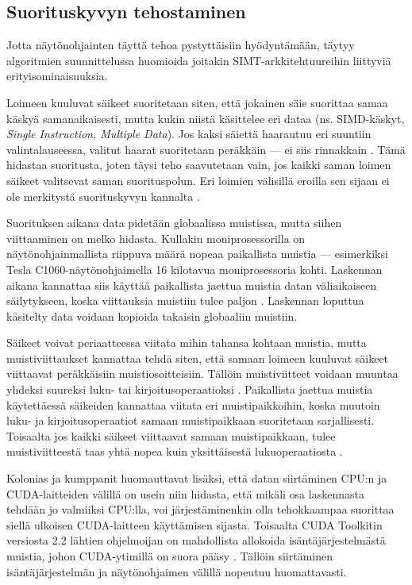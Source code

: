 \documentclass[a4paper,11pt]{article}
\newcommand{\engl}[1]{\foreignlanguage{english}{\em #1}}
\begin{document}
\subsection{Suorituskyvyn tehostaminen}

Jotta näytönohjainten täyttä tehoa pystyttäisiin hyödyntämään, täytyy algoritmien suunnittelussa huomioida joitakin SIMT-arkkitehtuureihin liittyviä erityisominaisuuksia.

Loimeen kuuluvat säikeet suoritetaan siten, että jokainen säie suorittaa samaa käskyä samanaikaisesti, mutta kukin niistä käsittelee eri dataa (ns. SIMD-käskyt, \engl{Single Instruction, Multiple Data}). Jos kaksi säiettä haarautuu eri suuntiin valintalauseessa, valitut haarat suoritetaan peräkkäin --- ei siis rinnakkain \cite{leischner2010}. Tämä hidastaa suoritusta, joten täysi teho saavutetaan vain, jos kaikki saman loimen säikeet valitsevat saman suorituspolun. Eri loimien välisillä eroilla sen sijaan ei ole merkitystä suorituskyvyn kannalta \cite{satish2009}.

Suorituksen aikana data pidetään globaalissa muistissa, mutta siihen viittaaminen on melko hidasta. Kullakin moniprosessorilla on näytönohjainmallista riippuva määrä nopeaa paikallista muistia --- esimerkiksi Tesla C1060-näytönohjaimella 16 kilotavua moniprosessoria kohti. Laskennan aikana kannattaa siis käyttää paikallista jaettua muistia datan väliaikaiseen säilytykseen, koska viittauksia muistiin tulee paljon \cite{leischner2010}. Laskennan loputtua käsitelty data voidaan kopioida takaisin globaaliin muistiin.

Säikeet voivat periaatteessa viitata mihin tahansa kohtaan muistia, mutta muistiviittaukset kannattaa tehdä siten, että samaan loimeen kuuluvat säikeet viittaavat peräkkäisiin muistiosoitteisiin. Tällöin muistiviitteet voidaan muuntaa yhdeksi suureksi luku- tai kirjoitusoperaatioksi \cite{satish2009}. Paikallista jaettua muistia käytettäessä säikeiden kannattaa viitata eri muistipaikkoihin, koska muutoin luku- ja kirjoitusoperaatiot samaan muistipaikkaan suoritetaan sarjallisesti. Toisaalta jos kaikki säikeet viittaavat samaan muistipaikkaan, tulee muistiviitteestä taas yhtä nopea kuin yksittäisestä lukuoperaatiosta \cite{cederman2009}.

Kolonias ja kumppanit \cite{kolonias2011} huomauttavat lisäksi, että datan siirtäminen CPU:n ja CUDA-laitteiden välillä on usein niin hidasta, että mikäli osa laskennasta tehdään jo valmiiksi CPU:lla, voi järjestäminenkin olla tehokkaampaa suorittaa siellä ulkoisen CUDA-laitteen käyttämisen sijasta. Toisaalta CUDA Toolkitin versiosta 2.2 lähtien ohjelmoijan on mahdollista allokoida isäntäjärjestelmästä muistia, johon CUDA-ytimillä on suora pääsy \cite{kolonias2011}. Tällöin siirtäminen isäntäjärjestelmän ja näytönohjaimen välillä nopeutuu huomattavasti.
\end{document}
